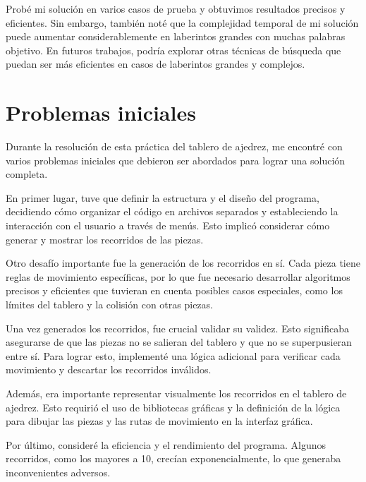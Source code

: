 Probé mi solución en varios casos de prueba y obtuvimos resultados precisos y eficientes. Sin embargo, también noté que la complejidad temporal de mi solución puede aumentar considerablemente en laberintos grandes con muchas palabras objetivo. En futuros trabajos, podría explorar otras técnicas de búsqueda que puedan ser más eficientes en casos de laberintos grandes y complejos.\newline
\\

\section{Problemas iniciales}
Durante la resolución de esta práctica del tablero de ajedrez, me encontré con varios problemas iniciales que debieron ser abordados para lograr una solución completa.\newline

En primer lugar, tuve que definir la estructura y el diseño del programa, decidiendo cómo organizar el código en archivos separados y estableciendo la interacción con el usuario a través de menús. Esto implicó considerar cómo generar y mostrar los recorridos de las piezas.\newline

Otro desafío importante fue la generación de los recorridos en sí. Cada pieza tiene reglas de movimiento específicas, por lo que fue necesario desarrollar algoritmos precisos y eficientes que tuvieran en cuenta posibles casos especiales, como los límites del tablero y la colisión con otras piezas.\newline

Una vez generados los recorridos, fue crucial validar su validez. Esto significaba asegurarse de que las piezas no se salieran del tablero y que no se superpusieran entre sí. Para lograr esto, implementé una lógica adicional para verificar cada movimiento y descartar los recorridos inválidos.\newline

Además, era importante representar visualmente los recorridos en el tablero de ajedrez. Esto requirió el uso de bibliotecas gráficas y la definición de la lógica para dibujar las piezas y las rutas de movimiento en la interfaz gráfica.\newline

Por último, consideré la eficiencia y el rendimiento del programa. Algunos recorridos, como los mayores a 10, crecían exponencialmente, lo que generaba inconvenientes adversos.\newline

